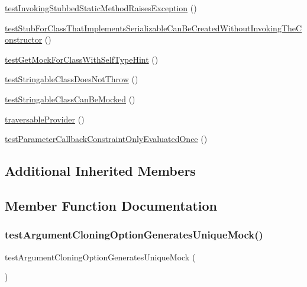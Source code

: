 \begin{DoxyCompactItemize}
\item 
\mbox{\hyperlink{class_framework___mock_object_test_a1244ef4b127e7005f335ecbdd5ae7e70}{test\+Invoking\+Stubbed\+Static\+Method\+Raises\+Exception}} ()
\item 
\mbox{\hyperlink{class_framework___mock_object_test_a2cbf4cacb351cfbca071cf7515ecf227}{test\+Stub\+For\+Class\+That\+Implements\+Serializable\+Can\+Be\+Created\+Without\+Invoking\+The\+Constructor}} ()
\item 
\mbox{\hyperlink{class_framework___mock_object_test_a3ac05f25d4549fbc7e756d7ce1290f58}{test\+Get\+Mock\+For\+Class\+With\+Self\+Type\+Hint}} ()
\item 
\mbox{\hyperlink{class_framework___mock_object_test_a157a45b1dcb2e91bc8a004ea09a8b2e8}{test\+Stringable\+Class\+Does\+Not\+Throw}} ()
\item 
\mbox{\hyperlink{class_framework___mock_object_test_ac5fa23aece621490d6b0e4ff04559e22}{test\+Stringable\+Class\+Can\+Be\+Mocked}} ()
\item 
\mbox{\hyperlink{class_framework___mock_object_test_a11a98869b9900d0259f91af2a8c1819e}{traversable\+Provider}} ()
\item 
\mbox{\hyperlink{class_framework___mock_object_test_a45e511ba0ee7e30290da9509c6758b4d}{test\+Parameter\+Callback\+Constraint\+Only\+Evaluated\+Once}} ()
\end{DoxyCompactItemize}
\subsection*{Additional Inherited Members}


\subsection{Member Function Documentation}
\mbox{\label{class_framework___mock_object_test_a4cbad31dc65d018aca3f68216ed7a3ec}} 
\subsubsection{\texorpdfstring{test\+Argument\+Cloning\+Option\+Generates\+Unique\+Mock()}{testArgumentCloningOptionGeneratesUniqueMock()}}
{\footnotesize\ttfamily test\+Argument\+Cloning\+Option\+Generates\+Unique\+Mock (\begin{DoxyParamCaption}{ }\end{DoxyParamCaption})}

